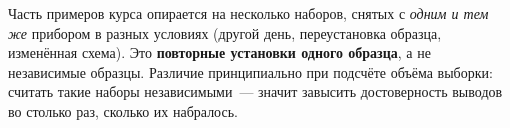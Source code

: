 \begin{warning}
Часть примеров курса опирается на несколько наборов, снятых с \emph{одним и тем же} прибором в
разных условиях (другой день, переустановка образца, изменённая схема). Это \textbf{повторные
установки одного образца}, а не независимые образцы. Различие принципиально при подсчёте объёма
выборки: считать такие наборы независимыми~--- значит завысить достоверность выводов во столько
раз, сколько их набралось.
\end{warning}
